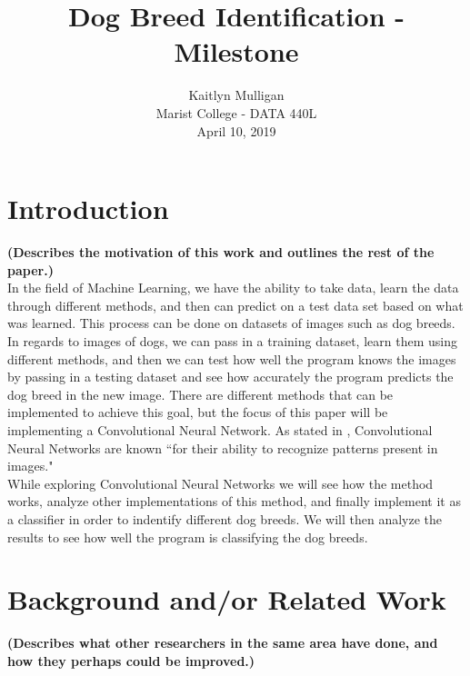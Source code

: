 \documentclass[12pt]{article}
\begin{document}
\lstset{language=Python}
 
\title{\textbf{Dog Breed Identification - Milestone}}
\date{}

\author{
        Kaitlyn Mulligan\\
        Marist College - DATA 440L \\
        April 10, 2019
 }

\maketitle

\begin{abstract}
    
\end{abstract} \hspace{10pt}
\thispagestyle{empty}
\clearpage
\setcounter{page}{1}

\section{Introduction}
\textbf{(Describes the motivation of this work and outlines the rest of the paper.)}\\
\indent In the field of Machine Learning, we have the ability to take data, learn the data through different methods, and then can predict on a test data set based on what was learned.  This process can be done on datasets of images such as dog breeds.  In regards to images of dogs, we can pass in a training dataset, learn them using different methods, and then we can test how well the program knows the images by passing in a testing dataset and see how accurately the program predicts the dog breed in the new image.  There are different methods that can be implemented to achieve this goal, but the focus of this paper will be implementing a Convolutional Neural Network.  As stated in \cite{Escontrela2018}, Convolutional Neural Networks are known ``for their ability to recognize patterns present in images."\\
\indent While exploring Convolutional Neural Networks we will see how the method works, analyze other implementations of this method, and finally implement it as a classifier in order to indentify different dog breeds.  We will then analyze the results to see how well the program is classifying the dog breeds.

\section{Background and/or Related Work}
\textbf{(Describes what other researchers in the same area have done, and how they perhaps could be improved.)}
\end{document}
